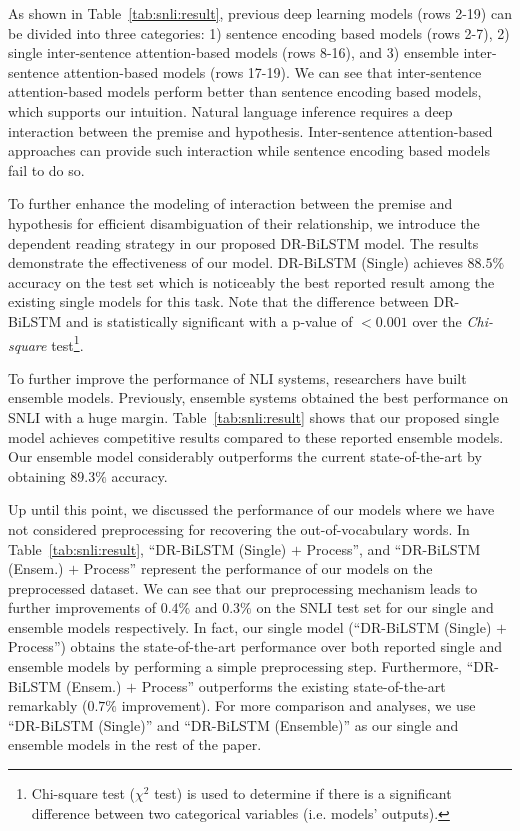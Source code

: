 \documentclass[11pt,a4paper]{article}
\begin{document}
	As shown in Table~\ref{tab:snli:result}, previous deep learning models (rows 2-19) can be divided into three categories: 1) sentence encoding based models (rows 2-7), 2) single inter-sentence attention-based models (rows 8-16), and 3) ensemble inter-sentence attention-based models (rows 17-19). We can see that inter-sentence attention-based models perform better than sentence encoding based models, which supports our intuition. Natural language inference requires a deep interaction between the premise and hypothesis. Inter-sentence attention-based approaches can provide such interaction while sentence encoding based models fail to do so. 

	To further enhance the modeling of interaction between the premise and hypothesis for efficient disambiguation of their relationship, we introduce the dependent reading strategy in our proposed DR-BiLSTM model. The results demonstrate the effectiveness of our model. DR-BiLSTM (Single) achieves $88.5\%$ accuracy on the test set which is noticeably the best reported result among the existing single models for this task. Note that the difference between DR-BiLSTM and \citet{him2017} is statistically significant with a p-value of $<0.001$ over the \emph{Chi-square} test\footnote{Chi-square test ($\chi^2$ test) is used to determine if there is a significant difference between two categorical variables (i.e. models' outputs).}.
	
	To further improve the performance of NLI systems, researchers have built ensemble models. Previously, ensemble systems obtained the best performance on SNLI with a huge margin. Table~\ref{tab:snli:result} shows that our proposed single model achieves competitive results compared to these reported ensemble models. Our ensemble model considerably outperforms the current state-of-the-art by obtaining $89.3\%$ accuracy.
	
	Up until this point, we discussed the performance of our models where we have not considered preprocessing for recovering the out-of-vocabulary words. In Table~\ref{tab:snli:result}, ``DR-BiLSTM (Single) $+$ Process'', and ``DR-BiLSTM (Ensem.) $+$ Process'' represent the performance of our models on the preprocessed dataset. We can see that our preprocessing mechanism leads to further improvements of $0.4\%$ and $0.3\%$ on the SNLI test set for our single and ensemble models respectively. In fact, our single model (``DR-BiLSTM (Single) $+$ Process'') obtains the state-of-the-art performance over both reported single and ensemble models by performing a simple preprocessing step. Furthermore, ``DR-BiLSTM (Ensem.) $+$ Process'' outperforms the existing state-of-the-art remarkably ($0.7\%$ improvement). For more comparison and analyses, we use ``DR-BiLSTM (Single)'' and ``DR-BiLSTM (Ensemble)'' as our single and ensemble models in the rest of the paper.
	
\end{document}
